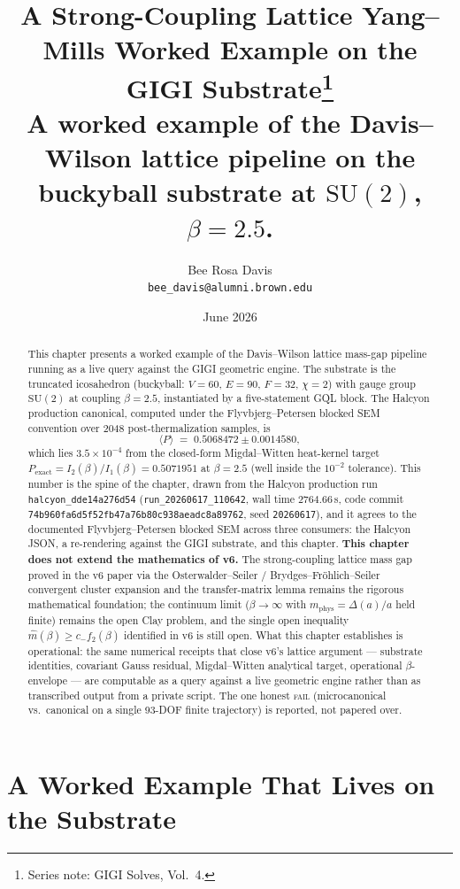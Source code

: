 \documentclass[12pt,a4paper]{article}
\title{A Strong-Coupling Lattice Yang--Mills Worked Example on the GIGI Substrate\footnote{Series note: GIGI Solves, Vol.~4.} \\[0.5em] \large A worked example of the Davis--Wilson lattice pipeline on the buckyball substrate at $\mathrm{SU}(2)$, $\beta = 2.5$.}
\author{Bee Rosa Davis \\ \small \texttt{bee\_davis@alumni.brown.edu}}
\date{June 2026}
\theoremstyle{plain}
\theoremstyle{definition}
\theoremstyle{remark}
\begin{document}
\maketitle

\begin{abstract}
This chapter presents a worked example of the Davis--Wilson lattice mass-gap pipeline running as a live query against the GIGI geometric engine. The substrate is the truncated icosahedron (buckyball: $V=60$, $E=90$, $F=32$, $\chi=2$) with gauge group $\mathrm{SU}(2)$ at coupling $\beta = 2.5$, instantiated by a five-statement GQL block. The Halcyon production canonical, computed under the Flyvbjerg--Petersen blocked SEM convention over 2048 post-thermalization samples, is
\[
\langle P \rangle \;=\; 0.5068472 \pm 0.0014580,
\]
which lies $3.5 \times 10^{-4}$ from the closed-form Migdal--Witten heat-kernel target $P_{\mathrm{exact}} = I_2(\beta)/I_1(\beta) = 0.5071951$ at $\beta = 2.5$ (well inside the $10^{-2}$ tolerance). This number is the spine of the chapter, drawn from the Halcyon production run \texttt{halcyon\_dde14a276d54} (\texttt{run\_20260617\_110642}, wall time $2764.66$\,s, code commit \texttt{74b960fa6d5f52fb47a76b80c938aeadc8a89762}, seed \texttt{20260617}), and it agrees to the documented Flyvbjerg--Petersen blocked SEM across three consumers: the Halcyon JSON, a re-rendering against the GIGI substrate, and this chapter. \textbf{This chapter does not extend the mathematics of v6.} The strong-coupling lattice mass gap proved in the v6 paper via the Osterwalder--Seiler / Brydges--Fr\"ohlich--Seiler convergent cluster expansion and the transfer-matrix lemma remains the rigorous mathematical foundation; the continuum limit ($\beta \to \infty$ with $m_{\mathrm{phys}} = \Delta(a)/a$ held finite) remains the open Clay problem, and the single open inequality $\hat m(\beta) \geq c_{-} f_{2}(\beta)$ identified in v6 is still open. What this chapter establishes is operational: the same numerical receipts that close v6's lattice argument --- substrate identities, covariant Gauss residual, Migdal--Witten analytical target, operational $\beta$-envelope --- are computable as a query against a live geometric engine rather than as transcribed output from a private script. The one honest \textsc{fail} (microcanonical vs.\ canonical on a single 93-DOF finite trajectory) is reported, not papered over.
\end{abstract}

\tableofcontents

\section{A Worked Example That Lives on the Substrate}
\label{sec:motivation}
\end{document}
